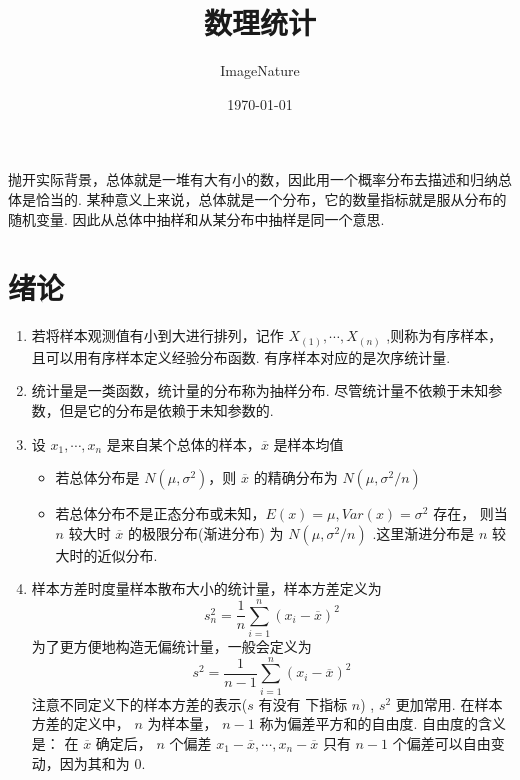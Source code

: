 \documentclass[a5paper,12pt]{article}
\title{数理统计}
\author{ImageNature}
\date{\today}
\begin{document}
\maketitle


抛开实际背景，总体就是一堆有大有小的数，因此用一个概率分布去描述和归纳总体是恰当的.
某种意义上来说，总体就是一个分布，它的数量指标就是服从分布的随机变量.
因此从总体中抽样和从某分布中抽样是同一个意思.
\section{绪论}

\begin{enumerate}
  \item 若将样本观测值有小到大进行排列，记作 $X_{(1)},\cdots,X_{(n)}$ ,则称为有序样本，且可以用有序样本定义经验分布函数. 有序样本对应的是次序统计量.
  \item 统计量是一类函数，统计量的分布称为抽样分布. 尽管统计量不依赖于未知参数，但是它的分布是依赖于未知参数的.
  \item 设 $x_1,\cdots,x_n$ 是来自某个总体的样本，$\overline{x}$ 是样本均值
  \begin{itemize}
    \item 若总体分布是 $N(\mu,\sigma^2)$，则 $\overline{x}$ 的精确分布为 $N(\mu,\sigma^2/n)$
    \item 若总体分布不是正态分布或未知，$E(x) = \mu,Var(x) = \sigma^2$ 存在，
    则当 $n$ 较大时 $\overline{x}$ 的极限分布(渐进分布) 为 $N(\mu,\sigma^2/n)$ .这里渐进分布是 $n$ 较大时的近似分布.
  \end{itemize}
 \item 样本方差时度量样本散布大小的统计量，样本方差定义为
 \[
 s_n^2 = \frac1 n \sum_{i=1}^{n} (x_i - \overline{x})^2
 \]
 为了更方便地构造无偏统计量，一般会定义为
 \[
 s^2 = \frac{1}{n-1}\sum_{i=1}^{n}(x_i - \overline{x})^2
 \]
  注意不同定义下的样本方差的表示($s$ 有没有 下指标 $n$) ,  $s^2$ 更加常用. 在样本方差的定义中， $n$ 为样本量， $n-1$ 称为偏差平方和的自由度. 自由度的含义是：
 在 $\overline{x}$ 确定后， $n$ 个偏差 $x_1 - \overline{x},\cdots,x_n - \overline{x}$ 只有
 $n-1$ 个偏差可以自由变动，因为其和为 $0$.





\end{enumerate}
\end{document}
